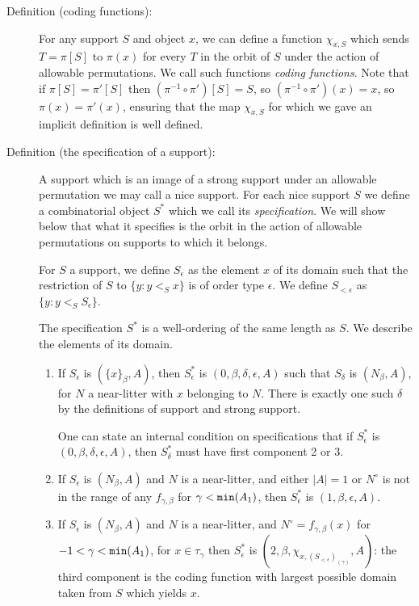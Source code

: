 \documentclass[112pt]{article}
\begin{document}
\begin{description}
\item[Definition (coding functions):]  For any support $S$ and object $x$, we can define a function $\chi_{x,S}$ which sends $T=\pi[S]$ to $\pi(x)$ for every $T$ in the orbit of $S$ under
the action of allowable permutations.  We call such functions {\em coding functions\/}.  Note that if $\pi[S]=\pi'[S]$ then $(\pi^{-1}\circ \pi')[S]= S$, so 
$(\pi^{-1}\circ \pi')(x)= x$, so $\pi(x)=\pi'(x)$, ensuring that the map $\chi_{x,S}$ for which we gave an implicit definition is well defined.

\item[Definition (the specification of a support):]  A support which is an image of a strong support under an allowable permutation we may call a nice support.  For each nice support $S$ we define a combinatorial object $S^*$ which we call its {\em specification\/}.  We will show below that what it specifies is the orbit in the action of allowable permutations on supports to which it belongs.

For $S$ a support, we define $S_\epsilon$ as the element $x$ of its domain such that the restriction of $S$ to $\{y:y <_S x\}$ is of order type $\epsilon$.  We define
$S_{<\epsilon}$ as $\{y:y <_S S_\epsilon\}$.

The specification $S^*$ is a well-ordering of the same length as $S$.  We describe the elements of its domain.

\begin{enumerate}

\item  If $S_{\epsilon}$ is $(\{x\}_\beta,A)$, then $S^*_\epsilon$ is $(0,\beta,\delta,\epsilon,A)$ such that $S_\delta$ is $(N_\beta,A)$, for $N$ a near-litter with $x$ belonging to $N$.  There is exactly one such $\delta$ by the definitions of support and strong support.

One can state an internal condition on specifications that if $S^*_\epsilon$ is $(0,\beta,\delta,\epsilon,A)$, then $S^*_\delta$ must have first component 2 or 3.

\item  If $S_\epsilon$ is $(N_\beta,A)$ and $N$ is a near-litter, and either $|A|=1$ or $N^\circ$ is not in the range of any $f_{\gamma,\beta}$ for $\gamma<{\tt min}(A_1)$, then $S^*_\epsilon$ is $(1,\beta,\epsilon,A)$.

\item  If $S_\epsilon$ is $(N_\beta,A)$ and $N$ is a near-litter, and $N^\circ=f_{\gamma,\beta}(x)$ for $-1<\gamma<{\tt min}(A_1)$, for $x\in \tau_\gamma$ then 
$S^*_\epsilon$ is $(2,\beta,\chi_{x,(S_{<\epsilon})_{(\gamma)}},A)$:  the third component is the coding function with largest possible domain taken from $S$ which yields $x$.


\end{enumerate}
\end{description}
\end{document}
